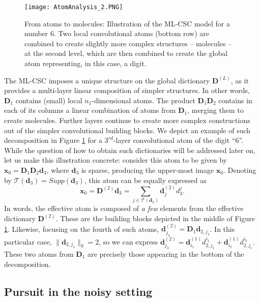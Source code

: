 \documentclass[10pt,journal]{IEEEtran}
\def\x{{\mathbf x}}
\def\d{{\mathbf d}}
\def\D{{\mathbf D}}
\theoremstyle{plain}
\theoremstyle{definition}
\begin{document}
\begin{figure}
\begin{center}
	\texttt{[image: AtomAnalysis\_2.PNG]}
	\caption{From atoms to molecules: Illustration of the ML-CSC model for a number 6. Two local convolutional atoms (bottom row) are combined to create slightly more complex structures -- molecules -- at the second level, which are then combined to create the global atom representing, in this case, a digit.
	}
	\label{Fig:atomDecomposition}
\end{center}
\end{figure}

The ML-CSC imposes a unique structure on the global dictionary $\D^{(L)}$, as it provides a multi-layer linear composition of simpler structures. In other words, $\D_1$ contains (small) local $n_1$-dimensional atoms. The product $\D_1\D_2$ contains in each of its columns a linear combination of atoms from $\D_1$, merging them to create molecules. Further layers continue to create more complex constructions out of the simpler convolutional building blocks. We depict an example of such decomposition in Figure \ref{Fig:atomDecomposition} for a $3^{rd}$-layer convolutional atom of the digit ``6''. While the question of how to obtain such dictionaries will be addressed later on, let us make this illustration concrete: consider this atom to be given by $\x_0 = \D_1\D_2\d_3$, where $\d_3$ is sparse, producing the upper-most image $\x_0$. Denoting by $\mathcal{T}(\d_3) = Supp(\d_3)$, this atom can be equally expressed as 
\begin{equation}
	\x_0 = \D^{(2)}\d_3 = \sum_{j\in \mathcal{T}(\d_3)} \d^{(2)}_j d^j_{3}.
\end{equation}
In words, the effective atom is composed of \emph{a few} elements from the effective dictionary $\D^{(2)}$. These are the building blocks depicted in the middle of Figure \ref{Fig:atomDecomposition}. Likewise, focusing on the fourth of such atoms, $\d^{(2)}_{j_4} = \D_1 \d_{2,j_4}$. In this particular case, $\|\d_{2,j_4}\|_0 = 2$, so we can express %
$\d^{(2)}_{j_4} =  \d^{(1)}_{i_1} d^{i_1}_{2,j_1} + \d^{(1)}_{i_2} d^{i_2}_{2,j_1}$.
These two atoms from $\D_1$ are precisely those appearing in the bottom of the decomposition.




\subsection{Pursuit in the noisy setting}
\end{document}
